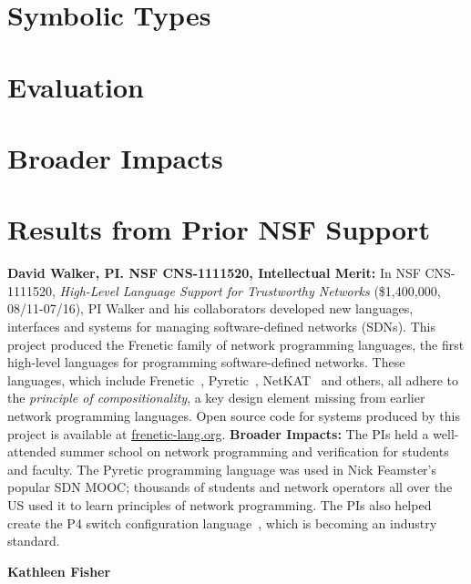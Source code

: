 \section{Symbolic Types}
\label{sec:eval}

\section{Evaluation}
\label{sec:eval}


\section{Broader Impacts}
\label{sec:impact}


\section{Results from Prior NSF Support}
\label{sec:prior-support}

\noindent
{\bf David Walker, PI. NSF CNS-1111520, Intellectual Merit:}
In NSF CNS-1111520, \emph{High-Level Language Support for Trustworthy Networks}
(\$1,400,000, 08/11-07/16),
PI Walker and his collaborators developed new languages, interfaces
and systems for managing software-defined networks (SDNs).  
This project produced the Frenetic family
of network programming languages, the first high-level languages for
programming software-defined networks.  These languages, which include
Frenetic~\cite{frenetic}, 
Pyretic~\cite{pyretic},
NetKAT~\cite{netkat} and others, all adhere to the
\emph{principle of compositionality}, a key design element missing
from earlier network programming languages.  
Open source code for systems produced by this project is available
at \url{frenetic-lang.org}.
%
{\bf Broader Impacts:} 
The PIs held a well-attended summer school on network programming and 
verification for students and faculty. The
Pyretic programming language was used in Nick Feamster's popular
SDN MOOC; thousands of students and
network operators all over the US used it to learn principles of network
programming.  The PIs
also helped create the P4 switch configuration language~\cite{P4}, which is
becoming an industry standard.

\medskip
\noindent
{\bf Kathleen Fisher} 


